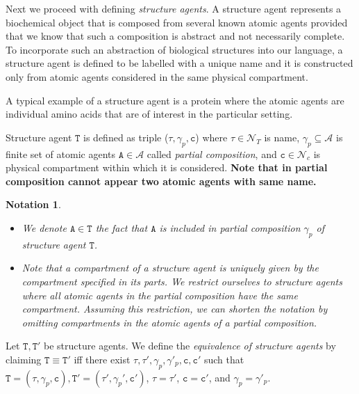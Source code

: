 \documentclass{entcs}
\renewcommand{\~}[0]{\texttildelow}
\newtheorem{notation}[thm]{Notation}
\begin{document}
Next we proceed with defining \emph{structure agents}. A structure agent represents a biochemical object that is composed from several known atomic agents provided that we know that such a composition is abstract and not necessarily complete. To incorporate such an abstraction of biological structures into our language, a structure agent is defined to be labelled with a unique name and it is constructed only from atomic agents considered in the same physical compartment. 

A typical example of a structure agent is a protein where the atomic agents are individual amino acids that are of interest in the particular setting.

\begin{definition}
Structure agent $\mathtt{T}$ is defined as triple ($\tau, \gamma_p, \mathtt{c}$) where $\tau \in \mathcal{N}_{T}$ is name, $\gamma_p \subseteq \mathcal{A}$ is finite set of atomic agents $\mathtt{A} \in \mathcal{A}$ called \emph{partial composition}, and $\mathtt{c} \in \mathcal{N}_{c}$ is physical compartment within which it is considered. \textbf{Note that in partial composition cannot appear two atomic agents with same name.}
\end{definition}

\begin{notation}
{~}
\begin{itemize}
\item We denote $\mathtt{A} \in \mathtt{T}$ the fact that $\mathtt{A}$ is included in partial composition $\gamma_p$ of structure agent $\mathtt{T}$.
\item Note that a compartment of a structure agent is uniquely given by the compartment specified in its parts. We restrict ourselves to structure agents where all atomic agents in the partial composition have the same compartment. Assuming this restriction, we can shorten the notation by omitting compartments in the atomic agents of a partial composition. 
\end{itemize}
\end{notation}

\begin{defn}
Let $\mathtt{T},\mathtt{T}'$ be structure agents. We define the \emph{equivalence of structure agents} by claiming $\mathtt{T}\equiv\mathtt{T}'$ iff there exist $\tau,\tau',\gamma_p,\gamma'_p,\mathtt{c},\mathtt{c}'$ such that $\mathtt{T}=(\tau, \gamma_p, \mathtt{c}),\mathtt{T}'=(\tau', \gamma_p', \mathtt{c}')$, $\tau=\tau'$, $\mathtt{c} = \mathtt{c}'$, and $\gamma_p=\gamma'_p$.
\end{defn}
\end{document}
